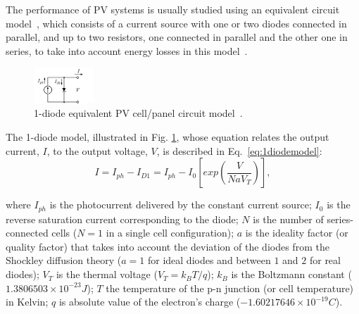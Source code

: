 \documentclass[journal]{IEEEtran}
\begin{document}
The performance of PV systems %
is usually studied using an equivalent circuit model~\cite{Yatimi,Saloux,Mellit}, which consists of a current source with one or two diodes connected in parallel, and up to two resistors, one connected in parallel and the other one in series, to take into account energy losses in this model~\cite{Cubas}. 
\begin{figure}[h]
\includegraphics[width=0.20\textwidth]{equivckt1D}
\centering
\caption{1-diode equivalent PV cell/panel circuit model~\cite{Cubas}.}
\label{fig:equivckt}
\end{figure}
 
The 1-diode model, illustrated in Fig. \ref{fig:equivckt}, whose equation relates the output current, $I$, to the output voltage, $V$, is described in Eq.~\eqref{eq:1diodemodel}:
\begin{equation}
\label{eq:1diodemodel}
I = I_{ph}-I_{D1}=I_{ph}-I_{0}\left[ exp \left( \dfrac{V}{NaV_{T}} \right)  \right], 
\end{equation}

\noindent where $I_{ph}$ is the photocurrent delivered by the constant current source; $I_{0}$ is the reverse saturation current corresponding to the diode; $N$ is the number of series-connected cells ($N=1$ in a single cell configuration); $a$ is the ideality factor (or quality factor) that takes into account the deviation of the diodes from the Shockley diffusion theory ($a=1$ for ideal diodes and between $1$ and $2$ for real diodes); $V_{T}$ is the thermal voltage ($ V_{T}=k_{B}T/q $); $ k_{B} $ is the Boltzmann constant ($ 1.3806503\times10^{-23}J $); $T$ the temperature of the p-n junction (or cell temperature) in Kelvin; $q$ is absolute value of the electron's charge ($ -1.60217646\times10^{-19}C $).
\end{document}
